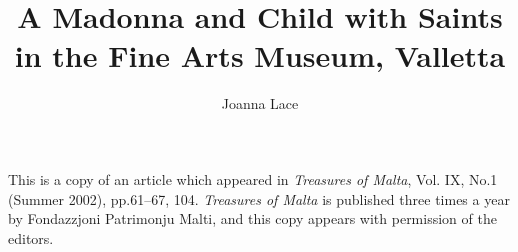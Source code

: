 \documentclass[a4paper,12pt]{article}
\begin{document}
\title{A Madonna and Child with Saints in the Fine Arts Museum,
Valletta}
\author{Joanna Lace}
\date{}
\maketitle

{\narrower
This is a copy of an article which appeared in
{\it Treasures of Malta},
Vol. IX, No.1 (Summer 2002), pp.61--67, 104. 
{\it Treasures of Malta} is published three times a year by
Fondazzjoni Patrimonju Malti, and this copy appears with permission of
the editors.
}
\end{document}
